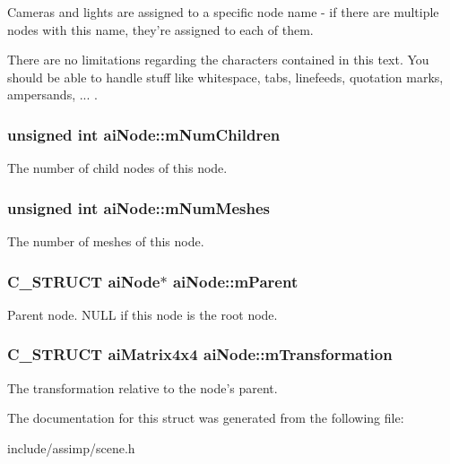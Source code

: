 \-Cameras and lights are assigned to a specific node name -\/ if there are multiple nodes with this name, they're assigned to each of them. \par
 \-There are no limitations regarding the characters contained in this text. \-You should be able to handle stuff like whitespace, tabs, linefeeds, quotation marks, ampersands, ... . \hypertarget{structaiNode_af5030494b156ec54632e6182a6e386ca}{
\subsubsection[{m\-Num\-Children}]{\setlength{\rightskip}{0pt plus 5cm}unsigned int {\bf ai\-Node\-::m\-Num\-Children}}}\label{structaiNode_af5030494b156ec54632e6182a6e386ca}
\-The number of child nodes of this node. \hypertarget{structaiNode_a7a411079096f86d1e96b6368d237d897}{
\subsubsection[{m\-Num\-Meshes}]{\setlength{\rightskip}{0pt plus 5cm}unsigned int {\bf ai\-Node\-::m\-Num\-Meshes}}}\label{structaiNode_a7a411079096f86d1e96b6368d237d897}
\-The number of meshes of this node. \hypertarget{structaiNode_aa6896b42c78e784db85d822a4c8dd404}{
\subsubsection[{m\-Parent}]{\setlength{\rightskip}{0pt plus 5cm}\-C\-\_\-\-S\-T\-R\-U\-C\-T {\bf ai\-Node}$\ast$ {\bf ai\-Node\-::m\-Parent}}}\label{structaiNode_aa6896b42c78e784db85d822a4c8dd404}
\-Parent node. \-N\-U\-L\-L if this node is the root node. \hypertarget{structaiNode_aadb69c766c7658bba9d2195af16d6831}{
\subsubsection[{m\-Transformation}]{\setlength{\rightskip}{0pt plus 5cm}\-C\-\_\-\-S\-T\-R\-U\-C\-T {\bf ai\-Matrix4x4} {\bf ai\-Node\-::m\-Transformation}}}\label{structaiNode_aadb69c766c7658bba9d2195af16d6831}
\-The transformation relative to the node's parent. 

\-The documentation for this struct was generated from the following file\-:\begin{DoxyCompactItemize}
\item 
include/assimp/scene.\-h\end{DoxyCompactItemize}
